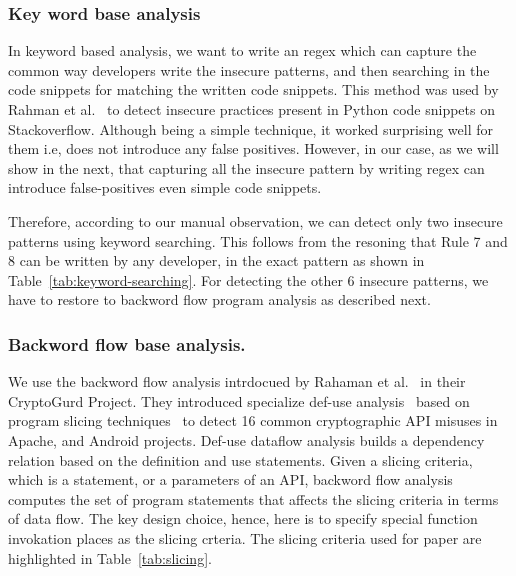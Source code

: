 \subsubsection{Key word base analysis}
In keyword based analysis, we want to write an regex which can capture the common way developers write the insecure patterns, and then searching in the code snippets for matching the written code snippets. This method was used by Rahman et al.~\cite{akondsnakes} to detect insecure practices present in Python code snippets on Stackoverflow. Although being a simple technique, it worked surprising well for them i.e, does not introduce any false positives. However, in our case, as we will show in the next, that capturing all the insecure pattern by writing regex can introduce false-positives even simple code snippets.

Therefore, according to our manual observation, we can detect only two insecure patterns using keyword searching. This follows from the resoning that Rule 7 and 8 can be written by any developer, in the exact pattern as shown in Table~\ref{tab:keyword-searching}. For detecting the other 6 insecure patterns, we have to restore to backword flow program analysis as described next.  

\subsubsection{Backword flow base analysis.}
We use the backword flow analysis intrdocued by Rahaman et al.~\cite{cryptogurd} in their CryptoGurd Project. They introduced specialize def-use analysis~\cite{use-def} based on program slicing techniques~\cite{program-slicing} to detect 16 common cryptographic API misuses in Apache, and Android projects. Def-use  dataflow analysis builds a dependency relation based on the definition and use statements. Given a slicing criteria, which is a statement, or a parameters of an API, backword flow analysis computes the set of program statements that affects the slicing criteria in terms of data flow. The key design choice, hence, here is to specify special function invokation places as the slicing crteria. The slicing criteria used for paper are highlighted in Table~\ref{tab:slicing}. 

